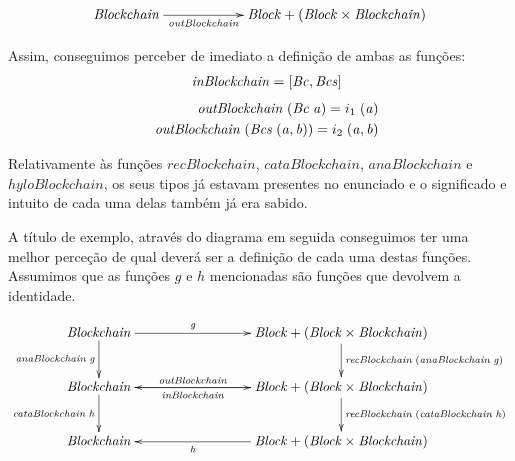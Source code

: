 \documentclass[a4paper]{article}
\newcommand{\Conid}[1]{\mathit{#1}}
\newcommand{\Varid}[1]{\mathit{#1}}
\begin{document}
\begin{eqnarray*}
\xymatrix@C=2cm{
     \ensuremath{\Conid{Blockchain}}
           \ar[r]_-{\ensuremath{\Varid{outBlockchain}}}
&
     \ensuremath{\Conid{Block}\mathbin{+}(\Conid{Block}\times\Conid{Blockchain})}
}
\end{eqnarray*}

Assim, conseguimos perceber de imediato a definição de ambas as funções:
\begin{eqnarray*}
\start
\ensuremath{\Varid{inBlockchain}\mathrel{=}\alt{\Conid{Bc}}{\Conid{Bcs}}}
\end{eqnarray*}
\begin{eqnarray*}
\start
\ensuremath{\Varid{outBlockchain}\;(\Conid{Bc}\;\Varid{a})\mathrel{=}i_1\;(\Varid{a})}
\more
\ensuremath{\Varid{outBlockchain}\;(\Conid{Bcs}\;(\Varid{a},\Varid{b}))\mathrel{=}i_2\;(\Varid{a},\Varid{b})}
\end{eqnarray*}

Relativamente às funções \ensuremath{\Varid{recBlockchain}}, \ensuremath{\Varid{cataBlockchain}},
\ensuremath{\Varid{anaBlockchain}} e \ensuremath{\Varid{hyloBlockchain}}, os seus tipos já estavam presentes
no enunciado e o significado e intuito de cada uma delas também já era sabido.

A título de exemplo, através do diagrama em seguida conseguimos ter uma
melhor perceção de qual deverá ser a definição de cada uma destas funções.
Assumimos que as funções \ensuremath{\Varid{g}} e \ensuremath{\Varid{h}} mencionadas são funções que devolvem
a identidade.


\begin{eqnarray*}
\xymatrix@C=3cm{
   \ensuremath{\Conid{Blockchain}}
          \ar[d]_-{\ensuremath{\Varid{anaBlockchain}\;\Varid{g}}}
           \ar[r]^-{\ensuremath{\Varid{g}}}
&
   \ensuremath{\Conid{Block}\mathbin{+}(\Conid{Block}\times\Conid{Blockchain})}
          \ar[d]^{\ensuremath{\Varid{recBlockchain}\;(\Varid{anaBlockchain}\;\Varid{g})}}
\\
    \ensuremath{\Conid{Blockchain}}
       \ar[d]_-{\ensuremath{\Varid{cataBlockchain}\;\Varid{h}}}
       \ar[r]^-{\ensuremath{\Varid{outBlockchain}}}
&
    \ensuremath{\Conid{Block}\mathbin{+}(\Conid{Block}\times\Conid{Blockchain})}
          \ar[l]^-{\ensuremath{\Varid{inBlockchain}}}
           \ar[d]^{\ensuremath{\Varid{recBlockchain}\;(\Varid{cataBlockchain}\;\Varid{h})}}
\\
   \ensuremath{\Conid{Blockchain}}
&
   \ensuremath{\Conid{Block}\mathbin{+}(\Conid{Block}\times\Conid{Blockchain})}
       \ar[l]^-{\ensuremath{\Varid{h}}}
}
\end{eqnarray*}
\end{document}
